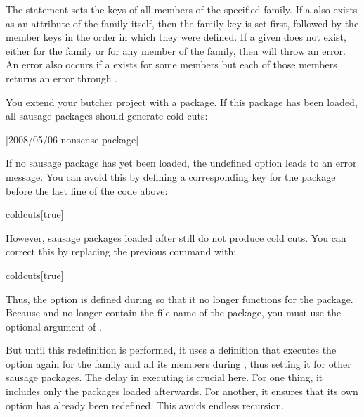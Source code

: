 The statement sets the keys of all members of the specified family. If a
 also exists as an attribute of the family itself, then the family
key is set first, followed by the member keys in the order in which they were
defined. If a given  does not exist, either for the family or for
any member of the family, then  will throw an error. An
error also occurs if a  exists for some members but each of those
members returns an error through .
\begin{Example}
  You extend your butcher project with a  package. If
  this package has been loaded, all sausage packages should generate cold
  cuts:
\begin{lstcode}
                  [2008/05/06 nonsense package]
  \relax
\end{lstcode}
  If no sausage package has yet been loaded, the undefined option
   leads to an error message. You can avoid this by defining
  a corresponding key for the package before the last line of the code above:
\begin{lstcode}
                  {coldcuts}[true]{}%
\end{lstcode}
  However, sausage packages loaded after  still do not
  produce cold cuts. You can correct this by replacing the previous command
  with:
\begin{lstcode}
                  {coldcuts}[true]{%
  }%
\end{lstcode}
  Thus, the option is defined during  so
  that it no longer functions for the  package. Because
   and  no longer contain the file name of
  the package, you must use the optional argument of
  .

  But until this redefinition is performed, it uses a definition that executes
  the option again for the family and all its members during
  , thus setting it for other sausage
  packages. The delay in executing  is crucial here. For
  one thing, it includes only the packages loaded afterwards. For another, it
  ensures that its own  option has already been redefined.
  This avoids endless recursion.
\end{Example}

